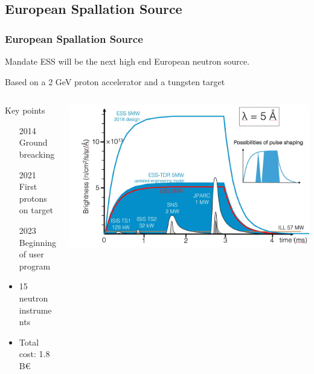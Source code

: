 \subsection{European Spallation Source}
\begin{frame}
  \frametitle{European Spallation Source}
  \begin{block}{Mandate}
    ESS will be the next high end European neutron source.

    Based on a 2 GeV proton accelerator and a tungsten target
  \end{block}
  \begin{columns}
    \begin{column}{0.4\textwidth}
      \begin{block}{Key points}
        \begin{itemize}
          \item[2014] Ground breacking
          \item[2021] First protons on target
          \item[2023] Beginning of user program
          \item 15 neutron instruments
          \item Total cost: 1.8 B€
        \end{itemize}
      \end{block}
    \end{column}
    \begin{column}{0.65\textwidth}
      \includegraphics[width=\textwidth]{01_Neutron/fig/fig000_ESS_pulse.jpeg}
    \end{column}
  \end{columns}
\end{frame}

